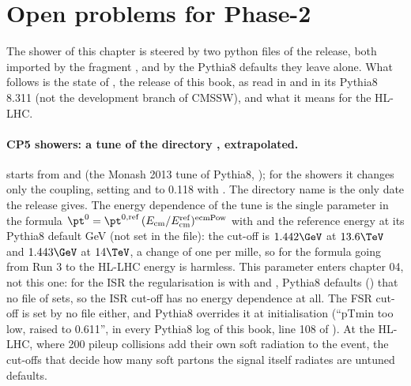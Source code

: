 \FloatBarrier
\section{Open problems for Phase-2}

The shower of this chapter is steered by two python files of the release, both imported by the fragment
, and by the Pythia8 defaults they leave
alone. What follows is the state of , the release of this book, as read in
 and in its Pythia8 8.311 (not the development branch of CMSSW), and what it
means for the HL-LHC.

\paragraph{CP5 showers: a tune of the directory , extrapolated.}
 starts from  and
 (the Monash 2013 tune of Pythia8, ); for the showers it changes only the
coupling, setting  and  to 0.118 with
. The directory name is the only date the release gives. The energy dependence of the tune
is the single parameter  in the formula
$\pt^0 = \pt^{0,\mathrm{ref}}\,(E_\mathrm{cm}/E_\mathrm{cm}^\mathrm{ref})^{\mathrm{ecmPow}}$ with
 and the reference energy at its Pythia8 default  GeV (not set in the file): the cut-off is $1.442\GeV$ at $13.6\TeV$ and $1.443\GeV$ at $14\TeV$, a change
of one per mille, so for the formula going from Run 3 to the HL-LHC energy is harmless. This parameter enters
chapter 04, not this one: for the ISR the regularisation is  with
 and , Pythia8 defaults ()
that no file of  sets, so the ISR cut-off has no energy dependence at all.
The FSR cut-off  is set by no file either, and Pythia8 overrides it at
initialisation (``pTmin too low, raised to 0.611'', in every Pythia8 log of this book, line 108 of
). At the HL-LHC, where 200 pileup collisions add their own soft radiation to the
event, the cut-offs that decide how many soft partons the signal itself radiates are untuned defaults.


